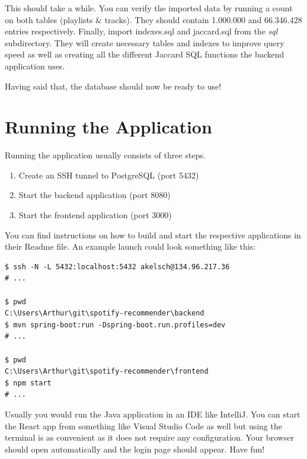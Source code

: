 This should take a while. You can verify the imported data by running a count on both tables (playlists \& tracks). They should contain 1.000.000 and 66.346.428 entries respectively. Finally, import indexes.sql and jaccard.sql from the \textit{sql} subdirectory. They will create necessary tables and indexes to improve query speed as well as creating all the different Jaccard SQL functions the backend application uses.

Having said that, the database should now be ready to use!

\section{Running the Application}

Running the application usually consists of three steps.

\begin{enumerate}
    \item Create an SSH tunnel to PostgreSQL (port 5432)
    \item Start the backend application (port 8080)
    \item Start the frontend application (port 3000)
\end{enumerate}

You can find instructions on how to build and start the respective applications in their Readme file. An example launch could look something like this:

\begin{lstlisting}[caption={Example of running the whole application}, style=Terminal]
$ ssh -N -L 5432:localhost:5432 akelsch@134.96.217.36
# ...

$ pwd
C:\Users\Arthur\git\spotify-recommender\backend
$ mvn spring-boot:run -Dspring-boot.run.profiles=dev
# ...

$ pwd
C:\Users\Arthur\git\spotify-recommender\frontend
$ npm start
# ...
\end{lstlisting}

Usually you would run the Java application in an IDE like IntelliJ. You can start the React app from something like Visual Studio Code as well but using the terminal is as convenient as it does not require any configuration. Your browser should open automatically and the login page should appear. Have fun!

